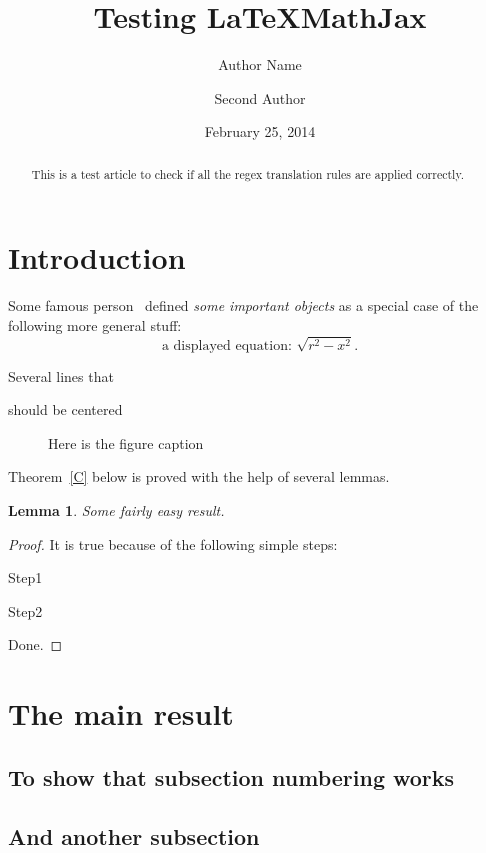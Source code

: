 \documentclass{amsart} %
\title[short title]{Testing LaTeXMathJax} %
\author{Author Name}
\author{Second Author}
\date{February 25, 2014}
\newtheorem{lemma}[theorem]{Lemma}
\begin{document}

\begin{abstract}
This is a test article to check if all the regex translation rules
are applied correctly.
\end{abstract}

\maketitle %

\section{Introduction}
Some famous person~\cite{FP99} defined \emph{some important objects} as 
a special case of the following more general stuff:
$$
\text{a displayed equation: }\sqrt{r^2-x^2}.
$$

\begin{center}
Several lines that

should be centered
\end{center}

\begin{figure}
\caption{Here is the figure caption}
\end{figure}

Theorem~\ref{C} below is proved with the help of several lemmas.

\begin{lemma}\label{A} Some fairly easy result.
\end{lemma}
\begin{proof}
It is true because of the following simple steps:

Step1

Step2

Done.
\end{proof}

\section{The main result} 
\subsection{To show that subsection numbering works}
\subsection{And another subsection}
\end{document}
